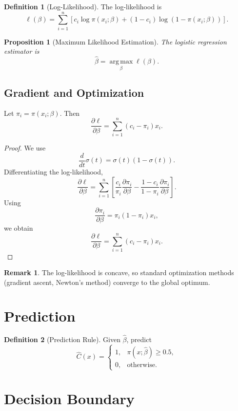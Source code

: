 \documentclass[12pt,oneside]{book}
\numberwithin{equation}{section}
\theoremstyle{definition}
\newtheorem{definition}{Definition}[section]
\newtheorem{remark}{Remark}[section]
\theoremstyle{plain}
\newtheorem{proposition}{Proposition}[section]
\theoremstyle{remark}
\newcommand{\argmax}{\operatorname*{arg\,max}}
\begin{document}
\begin{definition}[Log-Likelihood]
The log-likelihood is
\[
\ell(\beta)
=
\sum_{i=1}^n
\left[
c_i \log \pi(x_i;\beta)
+
(1-c_i)\log(1-\pi(x_i;\beta))
\right].
\]
\end{definition}

\begin{proposition}[Maximum Likelihood Estimation]
The logistic regression estimator is
\[
\hat{\beta}
=
\argmax_{\beta} \ell(\beta).
\]
\end{proposition}

\subsection{Gradient and Optimization}

Let $\pi_i = \pi(x_i;\beta)$. Then
\[
\frac{\partial \ell}{\partial \beta}
=
\sum_{i=1}^n (c_i - \pi_i)x_i.
\]

\begin{proof}
We use
\[
\frac{d}{dt}\sigma(t) = \sigma(t)(1-\sigma(t)).
\]
Differentiating the log-likelihood,
\[
\frac{\partial \ell}{\partial \beta}
=
\sum_{i=1}^n
\left[
\frac{c_i}{\pi_i}\frac{\partial \pi_i}{\partial \beta}
-
\frac{1-c_i}{1-\pi_i}\frac{\partial \pi_i}{\partial \beta}
\right].
\]
Using
\[
\frac{\partial \pi_i}{\partial \beta}
=
\pi_i(1-\pi_i)x_i,
\]
we obtain
\[
\frac{\partial \ell}{\partial \beta}
=
\sum_{i=1}^n
(c_i-\pi_i)x_i.
\]
\end{proof}

\begin{remark}
The log-likelihood is concave, so standard optimization methods (gradient ascent, Newton's method) converge to the global optimum.
\end{remark}

\section{Prediction}

\begin{definition}[Prediction Rule]
Given $\hat{\beta}$, predict
\[
\hat{C}(x)
=
\begin{cases}
1, & \pi(x;\hat{\beta}) \geq 0.5,\\
0, & \text{otherwise}.
\end{cases}
\]
\end{definition}

\section{Decision Boundary}
\end{document}
